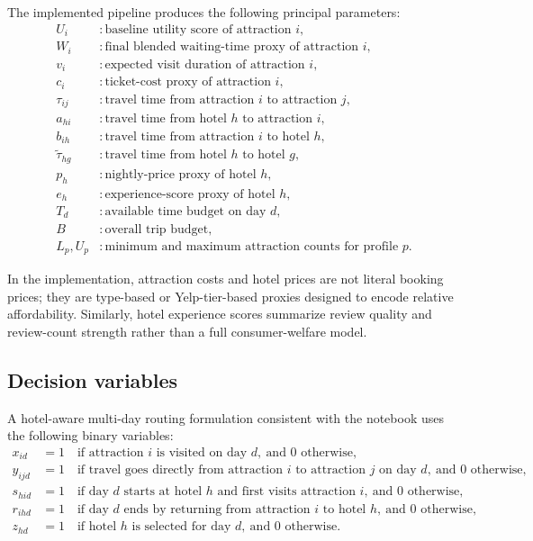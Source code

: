 \documentclass[12pt,a4paper]{article}
\begin{document}
The implemented pipeline produces the following principal parameters:
\begin{align*}
U_i & : \text{baseline utility score of attraction } i, \\
W_i & : \text{final blended waiting-time proxy of attraction } i, \\
v_i & : \text{expected visit duration of attraction } i, \\
c_i & : \text{ticket-cost proxy of attraction } i, \\
\tau_{ij} & : \text{travel time from attraction } i \text{ to attraction } j, \\
a_{hi} & : \text{travel time from hotel } h \text{ to attraction } i, \\
b_{ih} & : \text{travel time from attraction } i \text{ to hotel } h, \\
\widetilde{\tau}_{hg} & : \text{travel time from hotel } h \text{ to hotel } g, \\
p_h & : \text{nightly-price proxy of hotel } h, \\
e_h & : \text{experience-score proxy of hotel } h, \\
T_d & : \text{available time budget on day } d, \\
B & : \text{overall trip budget}, \\
L_p, U_p & : \text{minimum and maximum attraction counts for profile } p.
\end{align*}

In the implementation, attraction costs and hotel prices are not literal booking prices; they are type-based or Yelp-tier-based proxies designed to encode relative affordability. Similarly, hotel experience scores summarize review quality and review-count strength rather than a full consumer-welfare model.

\subsection{Decision variables}

A hotel-aware multi-day routing formulation consistent with the notebook uses the following binary variables:
\begin{align*}
x_{id} &= 1 \quad \text{if attraction } i \text{ is visited on day } d,\ \text{and } 0 \text{ otherwise},\\
y_{ijd} &= 1 \quad \text{if travel goes directly from attraction } i \text{ to attraction } j \text{ on day } d,\ \text{and } 0 \text{ otherwise},\\
s_{hid} &= 1 \quad \text{if day } d \text{ starts at hotel } h \text{ and first visits attraction } i,\ \text{and } 0 \text{ otherwise},\\
r_{ihd} &= 1 \quad \text{if day } d \text{ ends by returning from attraction } i \text{ to hotel } h,\ \text{and } 0 \text{ otherwise},\\
z_{hd} &= 1 \quad \text{if hotel } h \text{ is selected for day } d,\ \text{and } 0 \text{ otherwise.}
\end{align*}
\end{document}
